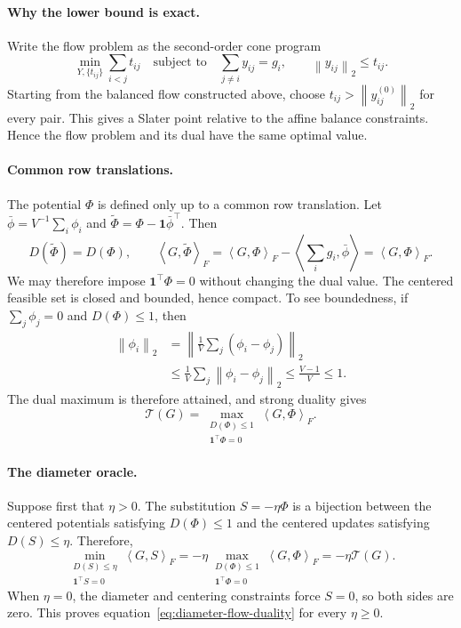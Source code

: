 \documentclass[anon]{opt2026} %
\newcommand{\one}{\mathbf{1}}
\newcommand{\norm}[1]{\left\lVert #1\right\rVert}
\newcommand{\inner}[2]{\left\langle #1,#2\right\rangle}
\begin{document}
\paragraph{Why the lower bound is exact.}
Write the flow problem as the second-order cone program
\[
\min_{Y,\{t_{ij}\}}
\sum_{i<j}t_{ij}
\quad\text{subject to}\quad
\sum_{j\neq i}y_{ij}=g_i,
\qquad
\norm{y_{ij}}_2\leq t_{ij}.
\]
Starting from the balanced flow constructed above, choose
$t_{ij}>\norm{y_{ij}^{(0)}}_2$ for every pair. This gives a Slater point
relative to the affine balance constraints. Hence the flow problem and its
dual have the same optimal value.

\paragraph{Common row translations.}
The potential $\Phi$ is defined only up to a common row translation. Let
$\bar\phi=V^{-1}\sum_i\phi_i$ and
$\widetilde\Phi=\Phi-\one\bar\phi^\top$. Then
\[
D(\widetilde\Phi)=D(\Phi),
\qquad
\inner{G}{\widetilde\Phi}_F
=
\inner{G}{\Phi}_F
-
\inner{\sum_i g_i}{\bar\phi}
=
\inner{G}{\Phi}_F.
\]
We may therefore impose $\one^\top\Phi=0$ without changing the dual value.
The centered feasible set is closed and bounded, hence compact. To see
boundedness, if $\sum_j\phi_j=0$ and $D(\Phi)\leq1$, then
\[
\begin{aligned}
\norm{\phi_i}_2
&=
\norm{\frac{1}{V}\sum_j(\phi_i-\phi_j)}_2 \\
&\leq
\frac{1}{V}\sum_j\norm{\phi_i-\phi_j}_2
\leq
\frac{V-1}{V}
\leq1.
\end{aligned}
\]
The dual maximum is therefore attained, and strong duality gives
\[
\mathcal T(G)
=
\max_{\substack{D(\Phi)\leq1\\\one^\top\Phi=0}}
\inner{G}{\Phi}_F.
\]

\paragraph{The diameter oracle.}
Suppose first that $\eta>0$. The substitution $S=-\eta\Phi$ is a
bijection between the centered potentials satisfying $D(\Phi)\leq1$ and
the centered updates satisfying $D(S)\leq\eta$. Therefore,
\[
\min_{\substack{D(S)\leq\eta\\\one^\top S=0}}
\inner{G}{S}_F
=
-\eta
\max_{\substack{D(\Phi)\leq1\\\one^\top\Phi=0}}
\inner{G}{\Phi}_F
=
-\eta\mathcal T(G).
\]
When $\eta=0$, the diameter and centering constraints force $S=0$, so both
sides are zero. This proves equation~\ref{eq:diameter-flow-duality} for
every $\eta\geq0$.
\end{document}
